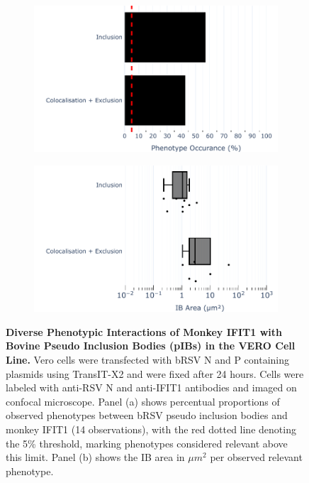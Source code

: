 \begin{figure}
    \begin{subfigure}{0.495\textwidth}
        \caption{}
        \includegraphics[width=1\linewidth]{08. Chapter 3/Figs/03. pIB/02. IFIT1/07. bar_i1_vero_bnbp.pdf}  
    \end{subfigure}
    \begin{subfigure}{0.495\textwidth}
        \caption{}
        \includegraphics[width=1\linewidth]{08. Chapter 3/Figs/03. pIB/02. IFIT1/08. box_i1_vero_bnbp.pdf}
    \end{subfigure}
    \caption[Diverse Phenotypic Interactions of Monkey IFIT1 with Bovine Pseudo Inclusion Bodies (pIBs) in the VERO Cell Line.]{\textbf{Diverse Phenotypic Interactions of Monkey IFIT1 with Bovine Pseudo Inclusion Bodies (pIBs) in the VERO Cell Line.} Vero cells were transfected with bRSV N and P containing plasmids using TransIT-X2 and were fixed after 24 hours. Cells were labeled with anti-RSV N and anti-IFIT1 antibodies and imaged on confocal microscope. Panel (a) shows percentual proportions of observed phenotypes between bRSV pseudo inclusion bodies and monkey IFIT1 (14 observations), with the red dotted line denoting the 5\% threshold, marking phenotypes considered relevant above this limit. Panel (b) shows the IB area in \(\mu m^2\) per observed relevant phenotype.}
    \label{fig:Diverse Phenotypic Interactions of Monkey IFIT1 with Bovine Pseudo Inclusion Bodies (pIBs) in the VERO Cell Line}
\end{figure}


